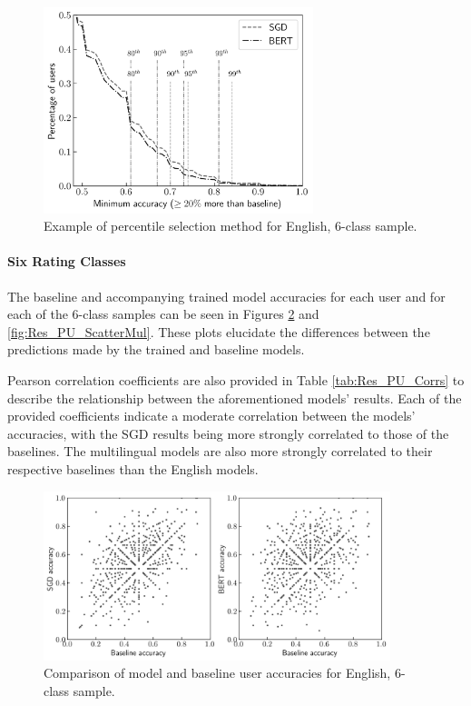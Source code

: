 \begin{figure}[ht]
    \centering
    \includegraphics[width=0.7\textwidth]{figures/06_results/02_pu/03_complex/eng_6.png}
    \caption{Example of percentile selection method for English, 6-class sample.}
    \label{fig:Res_PU_PctsExample}
\end{figure}

\paragraph{Six Rating Classes}

The baseline and accompanying trained model accuracies for each user and for each of the 6-class samples can be seen in Figures \ref{fig:Res_PU_ScatterEng} and \ref{fig:Res_PU_ScatterMul}. These plots elucidate the differences between the predictions made by the trained and baseline models.

Pearson correlation coefficients are also provided in Table \ref{tab:Res_PU_Corrs} to describe the relationship between the aforementioned models' results. Each of the provided coefficients indicate a moderate correlation between the models' accuracies, with the SGD results being more strongly correlated to those of the baselines. The multilingual models are also more strongly correlated to their respective baselines than the English models.

\begin{figure}[ht]
    \centering
    \includegraphics[width=0.9\textwidth]{figures/06_results/02_pu/04_scatter/eng_6.png}
    \caption{Comparison of model and baseline user accuracies for English, 6-class sample.}
    \label{fig:Res_PU_ScatterEng}
\end{figure}

